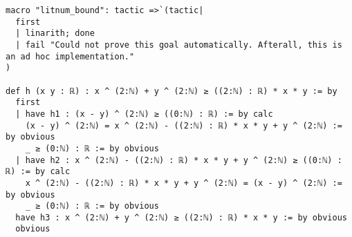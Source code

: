\documentclass{article}
\begin{document}
\begin{tcolorbox}[colback=white!10, width=\linewidth]
\begin{lstlisting}[language=Lean4]
macro "litnum_bound": tactic =>`(tactic|
  first
  | linarith; done
  | fail "Could not prove this goal automatically. Afterall, this is an ad hoc implementation."
)

def h (x y : ℝ) : x ^ (2:ℕ) + y ^ (2:ℕ) ≥ ((2:ℕ) : ℝ) * x * y := by
  first
  | have h1 : (x - y) ^ (2:ℕ) ≥ ((0:ℕ) : ℝ) := by calc
    (x - y) ^ (2:ℕ) = x ^ (2:ℕ) - ((2:ℕ) : ℝ) * x * y + y ^ (2:ℕ) := by obvious
    _ ≥ (0:ℕ) : ℝ := by obvious
  | have h2 : x ^ (2:ℕ) - ((2:ℕ) : ℝ) * x * y + y ^ (2:ℕ) ≥ ((0:ℕ) : ℝ) := by calc
    x ^ (2:ℕ) - ((2:ℕ) : ℝ) * x * y + y ^ (2:ℕ) = (x - y) ^ (2:ℕ) := by obvious
    _ ≥ (0:ℕ) : ℝ := by obvious
  have h3 : x ^ (2:ℕ) + y ^ (2:ℕ) ≥ ((2:ℕ) : ℝ) * x * y := by obvious
  obvious

\end{lstlisting}
\end{tcolorbox}
\end{document}
